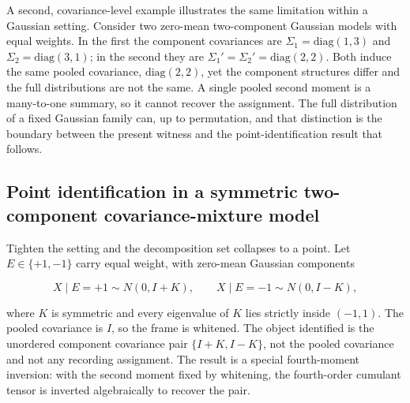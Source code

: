 A second, covariance-level example illustrates the same limitation
within a Gaussian setting. Consider two zero-mean two-component Gaussian
models with equal weights. In the first the component covariances are
\(\Sigma_1=\mathrm{diag}(1,3)\) and \(\Sigma_2=\mathrm{diag}(3,1)\); in
the second they are \(\Sigma_1'=\Sigma_2'=\mathrm{diag}(2,2)\). Both
induce the same pooled covariance, \(\mathrm{diag}(2,2)\), yet the
component structures differ and the full distributions are not the same.
A single pooled second moment is a many-to-one summary, so it cannot
recover the assignment. The full distribution of a fixed Gaussian family
can, up to permutation, and that distinction is the boundary between the
present witness and the point-identification result that follows.

\subsection{Point identification in a symmetric two-component
covariance-mixture
model}\label{point-identification-in-a-symmetric-two-component-covariance-mixture-model}

Tighten the setting and the decomposition set collapses to a point. Let
\(E\in\{+1,-1\}\) carry equal weight, with zero-mean Gaussian components

\[X\mid E=+1\sim N(0,I+K),\qquad X\mid E=-1\sim N(0,I-K),\]

where \(K\) is symmetric and every eigenvalue of \(K\) lies strictly
inside \((-1,1)\). The pooled covariance is \(I\), so the frame is
whitened. The object identified is the unordered component covariance
pair \(\{I+K,I-K\}\), not the pooled covariance and not any recording
assignment. The result is a special fourth-moment inversion: with the
second moment fixed by whitening, the fourth-order cumulant tensor is
inverted algebraically to recover the pair.

